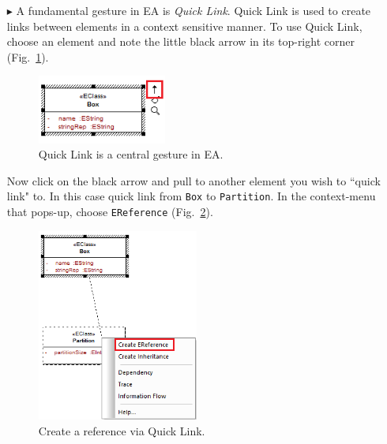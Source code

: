 \begin{enumerate}


\item[$\blacktriangleright$] A fundamental gesture in EA is \emph{Quick Link}.
Quick Link is used to create links between elements in a context sensitive manner.
To use Quick Link, choose an element and note the little black arrow in its top-right corner (Fig.~\ref{fig:quicklink}).

\begin{figure}[htbp]
	\centering
  \includegraphics[width=0.4\textwidth]{pics/memBoxBilder/memBox23.png}
	\caption{Quick Link is a central gesture in EA.}
	\label{fig:quicklink}
\end{figure}

Now click on the black arrow and pull to another element you wish to ``quick link" to.
In this case quick link from \texttt{Box} to \texttt{Partition}.
In the context-menu that pops-up, choose \texttt{EReference} (Fig.~\ref{fig:ereference}).

\begin{figure}[htbp]
	\centering
  \includegraphics[width=0.5\textwidth]{pics/memBoxBilder/memBox24.png}
	\caption{Create a reference via Quick Link.}
	\label{fig:ereference}
\end{figure}


\end{enumerate}
